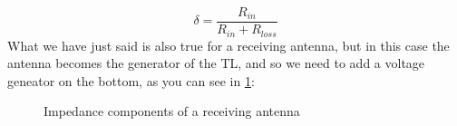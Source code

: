 \begin{equation}
    \delta =\frac{R_{in}}{R_{in}+R_{loss}}
\end{equation}
What we have just said is also true for a receiving antenna, but in this case the antenna becomes the generator of the TL, and so we need to add a voltage geneator on the bottom, as you can see in \cref{fig:impedance_antenna_receiving}:
\begin{figure}[H]
    \begin{center}
    \end{center} \caption{Impedance components of a receiving antenna}\label{fig:impedance_antenna_receiving} 
\end{figure}